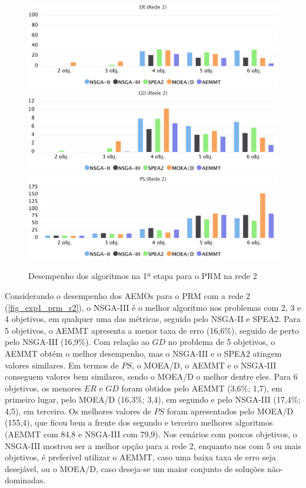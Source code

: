 \begin{figure}[!htbp]	
	\includegraphics[width=1\textwidth]{cap_experimentos/figs/etapa1/er-mrp-r2}
	\includegraphics[width=1\textwidth]{cap_experimentos/figs/etapa1/gd-mrp-r2}
	\includegraphics[width=1\textwidth]{cap_experimentos/figs/etapa1/ps-mrp-r2}
	\caption{\label{fig_exp1_prm_r2}Desempenho dos algoritmos na 1ª etapa para o PRM na rede 2}
\end{figure}

Considerando o desempenho dos AEMOs para o PRM com a rede 2 (\autoref{fig_exp1_prm_r2}), o NSGA-III é o melhor algoritmo nos problemas com 2, 3 e 4 objetivos, em qualquer uma das métricas, seguido pelo NSGA-II e SPEA2. Para 5 objetivos, o AEMMT apresenta a menor taxa de erro (16,6\%), seguido de perto pelo NSGA-III (16,9\%). Com relação ao $GD$ no problema de 5 objetivos, o AEMMT obtém o melhor desempenho, mas o NSGA-III e o SPEA2 atingem valores similares. Em termos de $PS$, o MOEA/D, o AEMMT e o NSGA-III conseguem valores bem similares, sendo o MOEA/D o melhor dentre eles. Para 6 objetivos, os menores $ER$ e $GD$ foram obtidos pelo AEMMT (3,6\%; 1,7), em primeiro lugar, pelo MOEA/D (16,3\%; 3,4), em segundo e pelo NSGA-III (17,4\%; 4,5), em terceiro. Os melhores valores de $PS$ foram apresentados pelo MOEA/D (155,4), que ficou bem a frente dos segundo e terceiro melhores algoritmos (AEMMT com 84,8 e NSGA-III com 79,9). Nos cenários com poucos objetivos, o NSGA-III mostrou ser a melhor opção para a rede 2, enquanto nos com 5 ou mais objetivos, é preferível utilizar o AEMMT, caso uma baixa taxa de erro seja desejável, ou o MOEA/D, caso deseja-se um maior conjunto de soluções não-dominadas.

